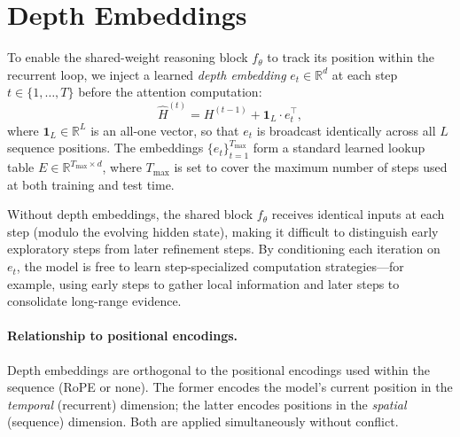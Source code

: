\section{Depth Embeddings} \label{app:depth-embedding-details}

To enable the shared-weight reasoning block $f_\theta$ to track its position within the recurrent loop, we inject a learned \emph{depth embedding} $e_t \in \mathbb{R}^d$ at each step $t \in \{1, \dots, T\}$ before the attention computation:
\begin{equation}
    \hat{H}^{(t)} = H^{(t-1)} + \mathbf{1}_L \cdot e_t^\top,
\end{equation}
where $\mathbf{1}_L \in \mathbb{R}^L$ is an all-one vector, so that $e_t$ is broadcast identically across all $L$ sequence positions. The embeddings $\{e_t\}_{t=1}^{T_{\max}}$ form a standard learned lookup table $E \in \mathbb{R}^{T_{\max} \times d}$, where $T_{\max}$ is set to cover the maximum number of steps used at both training and test time.

Without depth embeddings, the shared block $f_\theta$ receives identical inputs at each step (modulo the evolving hidden state), making it difficult to distinguish early exploratory steps from later refinement steps. By conditioning each iteration on $e_t$, the model is free to learn step-specialized computation strategies---for example, using early steps to gather local information and later steps to consolidate long-range evidence.

\paragraph{Relationship to positional encodings.}

Depth embeddings are orthogonal to the positional encodings used within the sequence (RoPE or none). The former encodes the model's current position in the \emph{temporal} (recurrent) dimension; the latter encodes positions in the \emph{spatial} (sequence) dimension. Both are applied simultaneously without conflict.
